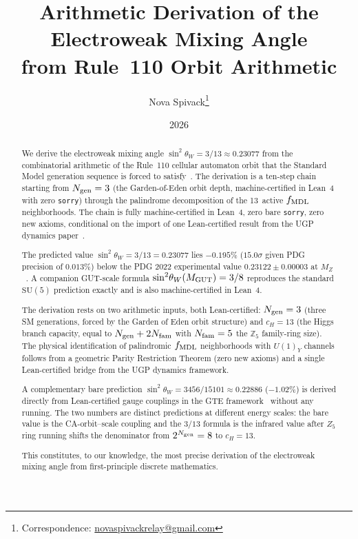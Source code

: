 \documentclass[11pt]{article}
\title{\bfseries Arithmetic Derivation of the Electroweak Mixing Angle\\[0.3em]
from Rule~110 Orbit Arithmetic}
\author[1]{Nova Spivack\thanks{Correspondence:
  \href{mailto:novaspivackrelay@gmail.com}{novaspivackrelay@gmail.com}}}
\affil[1]{Independent Research}
\date{2026}
\theoremstyle{remark}
\newcommand{\Ngen}{N_{\rm gen}}
\newcommand{\Nfam}{N_{\rm fam}}
\newcommand{\cH}{c_H}
\newcommand{\sinwsq}{\sin^2\!\theta_W}
\begin{document}
\maketitle
\NovaZenodoAfterTitle

\begin{abstract}
We derive the electroweak mixing angle $\sinwsq = 3/13 \approx 0.23077$ from the
combinatorial arithmetic of the Rule~110 cellular automaton orbit that the Standard Model
generation sequence is forced to satisfy~\cite{SpivackCompUniversality}.
The derivation is a ten-step chain starting from $\Ngen = 3$ (the Garden-of-Eden orbit
depth, machine-certified in Lean~4 with zero \texttt{sorry}) through the palindrome
decomposition of the 13~active $f_{\rm MDL}$ neighborhoods.  The chain is fully
machine-certified in Lean~4, zero bare \texttt{sorry}, zero new axioms, conditional on the
import of one Lean-certified result from the UGP dynamics
paper~\cite{Spivack2026_UGPDynamics}.

The predicted value $\sinwsq = 3/13 = 0.23077$ lies $-0.195\%$ ($15.0\sigma$ given
PDG precision of $0.013\%$) below the PDG 2022 experimental value
$0.23122 \pm 0.00003$ at $M_Z$~\cite{ParticleDataGroup2022}.
A companion GUT-scale formula $\sinwsq(M_{\rm GUT}) = 3/8$ reproduces the standard
$\mathrm{SU}(5)$ prediction exactly and is also machine-certified in Lean~4.

The derivation rests on two arithmetic inputs, both Lean-certified:
$\Ngen = 3$ (three SM generations, forced by the Garden of Eden orbit structure) and
$\cH = 13$ (the Higgs branch capacity, equal to $\Ngen + 2\Nfam$ with $\Nfam = 5$ the
$\mathbb{Z}_5$ family-ring size).  The physical identification of palindromic
$f_{\rm MDL}$ neighborhoods with $U(1)_Y$ channels follows from a geometric Parity
Restriction Theorem (zero new axioms) and a single Lean-certified bridge from the UGP
dynamics framework.

A complementary bare prediction $\sinwsq = 3456/15101 \approx 0.22886$ ($-1.02\%$)
is derived directly from Lean-certified gauge couplings in the GTE
framework~\cite{Spivack2026_SM_UGP} without any running.  The two numbers are distinct
predictions at different energy scales: the bare value is the CA-orbit--scale coupling
and the $3/13$ formula is the infrared value after $Z_5$ ring running shifts the
denominator from $2^{\Ngen} = 8$ to $\cH = 13$.

This constitutes, to our knowledge, the most precise derivation of the electroweak
mixing angle from first-principle discrete mathematics.
\end{abstract}
\end{document}
